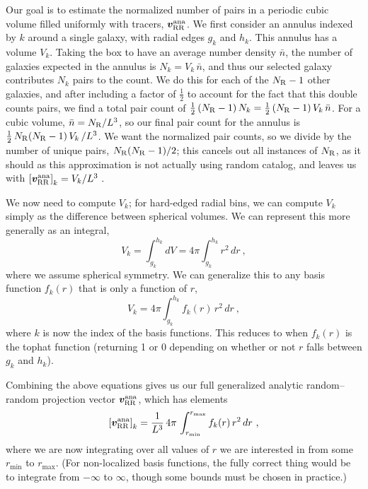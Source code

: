 Our goal is to estimate the normalized number of pairs in a periodic cubic volume filled uniformly with tracers, $\bm{v}_\mathrm{RR}^\mathrm{ana}$. 
We first consider an annulus indexed by $k$ around a single galaxy, with radial edges $g_k$ and $h_k$. 
This annulus has a volume $V_k$.
Taking the box to have an average number density $\bar{n}$, the number of galaxies expected in the annulus is $N_k = V_k \, \bar{n}$, and thus our selected galaxy contributes $N_k$ pairs to the count.   
We do this for each of the $N_\mathrm{R}-1$ other galaxies, and after including a factor of $\frac{1}{2}$ to account for the fact that this double counts pairs, we find a total pair count of $\frac{1}{2} \, (N_\mathrm{R}-1) \, N_k = \frac{1}{2} \, (N_\mathrm{R}-1) \, V_k \, \bar{n}$.
For a cubic volume, $\bar{n} = N_\mathrm{R}/L^3$, so our final pair count for the annulus is  $\frac{1}{2} \, N_\mathrm{R}(N_\mathrm{R}-1) \, V_k \, / L^3$.
We want the normalized pair counts, so we divide by the number of unique pairs, $N_\mathrm{R}(N_\mathrm{R}-1)/2$; this cancels out all instances of $N_\mathrm{R}$, as it should as this approximation is not actually using random catalog, and leaves us with $\left[ \bm{v}_\mathrm{RR}^\mathrm{ana} \right]_k = V_k / L^3 ~.$

We now need to compute $V_k$; for hard-edged radial bins, we can compute $V_k$ simply as the difference between spherical volumes. 
We can represent this more generally as an integral,
\begin{equation} \label{eq:vol_tophat}
V_k = \int_{g_k}^{h_k} dV = 4\pi \int_{g_k}^{h_k} r^2 \, dr ~,
\end{equation}
where we assume spherical symmetry.
We can generalize this to any basis function $f_k(r)$ that is only a function of $r$,
\begin{equation}
V_k = 4\pi  \int_{g_k}^{h_k} f_k(r) \, r^2 \, dr ~,
\end{equation}
where $k$ is now the index of the basis functions.
This reduces to  when $f_k(r)$ is the tophat function (returning 1 or 0 depending on whether or not $r$ falls between $g_k$ and $h_k$).

Combining the above equations gives us our full generalized analytic random--random projection vector $\bm{v}_\mathrm{RR}^\mathrm{ana}$, which has elements
\begin{equation}
\left[ \bm{v}_\mathrm{RR}^\mathrm{ana} \right]_k = \frac{1}{L^3} \, 4\pi \, \int_{r_\mathrm{min}}^{r_\mathrm{max}} f_k(r) \, r^2 \, dr ~,
\end{equation}
where we are now integrating over all values of $r$ we are interested in from some $r_\mathrm{min}$ to $r_\mathrm{max}$.
(For non-localized basis functions, the fully correct thing would be to integrate from $-\infty$ to $\infty$, though some bounds must be chosen in practice.)

